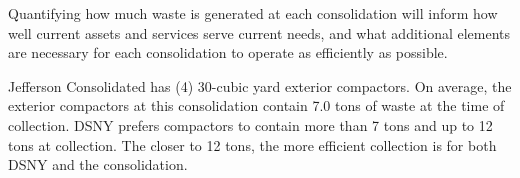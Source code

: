 
    Quantifying how much waste is generated at each consolidation will inform how well current assets and services serve current needs, and what additional elements are necessary for each consolidation to operate as efficiently as possible.
    
    Jefferson Consolidated has (4) 30-cubic yard exterior compactors. On average, the exterior compactors at this consolidation contain 7.0 tons of waste at the time of collection. DSNY prefers compactors to contain more than 7 tons and up to 12 tons at collection. The closer to 12 tons, the more efficient collection is for both DSNY and the consolidation.